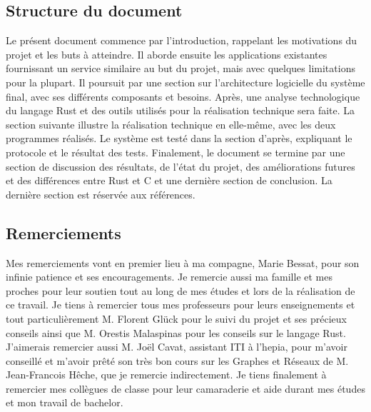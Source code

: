 \documentclass[a4paper, 12pt]{article}
\begin{document}
\subsection*{Structure du document} %
Le présent document commence par l'introduction, rappelant les motivations du projet et les buts à 
atteindre. Il aborde ensuite les applications existantes fournissant un service similaire au but du 
projet, mais avec quelques limitations pour la plupart. Il poursuit par une section sur l'architecture 
logicielle du système final, avec ses différents composants et besoins. Après, une analyse technologique du 
langage Rust et des outils utilisés pour la réalisation technique sera faite. La section suivante illustre 
la réalisation technique en elle-même, avec les deux programmes réalisés. Le système est testé dans 
la section d'après, expliquant le protocole et le résultat des tests. Finalement, le document se 
termine par une section de discussion des résultats, de l'état du projet, des améliorations futures 
et des différences entre Rust et C et une dernière section de conclusion. La dernière section 
est réservée aux références.

\subsection*{Remerciements} %
Mes remerciements vont en premier lieu à ma compagne, Marie Bessat, pour son infinie patience et ses encouragements.
Je remercie aussi ma famille et mes proches pour leur soutien tout au long de mes études et 
lors de la réalisation de ce travail. Je tiens à remercier tous mes professeurs pour leurs 
enseignements et tout particulièrement M. Florent Glück pour le suivi du projet et ses précieux 
conseils ainsi que M. Orestis Malaspinas pour les conseils sur le langage Rust. J'aimerais remercier aussi 
M. Joël Cavat, assistant ITI à l'hepia, pour m'avoir conseillé et m'avoir prêté son très bon 
cours sur les Graphes et Réseaux de M. Jean-Francois Hêche, que je remercie indirectement. 
Je tiens finalement à remercier mes collègues de classe pour leur camaraderie et aide durant mes 
études et mon travail de bachelor.

\newpage
\end{document}
